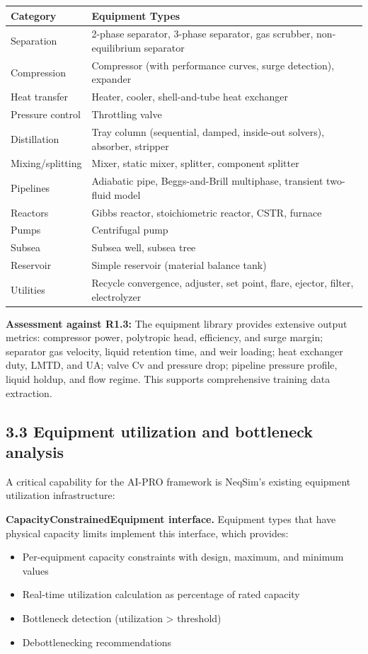 \documentclass[review,3p]{custom}
\begin{document}
\begin{table}[htbp]
\centering
\begin{tabular}{ll}
\toprule
Category & Equipment Types \\
\midrule
Separation & 2-phase separator, 3-phase separator, gas scrubber, non-equilibrium separator \\
Compression & Compressor (with performance curves, surge detection), expander \\
Heat transfer & Heater, cooler, shell-and-tube heat exchanger \\
Pressure control & Throttling valve \\
Distillation & Tray column (sequential, damped, inside-out solvers), absorber, stripper \\
Mixing/splitting & Mixer, static mixer, splitter, component splitter \\
Pipelines & Adiabatic pipe, Beggs-and-Brill multiphase, transient two-fluid model \\
Reactors & Gibbs reactor, stoichiometric reactor, CSTR, furnace \\
Pumps & Centrifugal pump \\
Subsea & Subsea well, subsea tree \\
Reservoir & Simple reservoir (material balance tank) \\
Utilities & Recycle convergence, adjuster, set point, flare, ejector, filter, electrolyzer \\
\bottomrule
\end{tabular}
\end{table}

\textbf{Assessment against R1.3:} The equipment library provides extensive output metrics: compressor power, polytropic head, efficiency, and surge margin; separator gas velocity, liquid retention time, and weir loading; heat exchanger duty, LMTD, and UA; valve Cv and pressure drop; pipeline pressure profile, liquid holdup, and flow regime. This supports comprehensive training data extraction.

\subsection{3.3 Equipment utilization and bottleneck analysis}

A critical capability for the AI-PRO framework is NeqSim's existing equipment utilization infrastructure:

\textbf{CapacityConstrainedEquipment interface.} Equipment types that have physical capacity limits implement this interface, which provides:
\begin{itemize}
  \item Per-equipment capacity constraints with design, maximum, and minimum values
  \item Real-time utilization calculation as percentage of rated capacity
  \item Bottleneck detection (utilization > threshold)
  \item Debottlenecking recommendations
\end{itemize}
\end{document}
